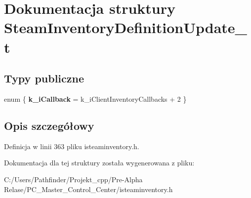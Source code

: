 \hypertarget{struct_steam_inventory_definition_update__t}{}\section{Dokumentacja struktury Steam\+Inventory\+Definition\+Update\+\_\+t}
\label{struct_steam_inventory_definition_update__t}
\subsection*{Typy publiczne}
\begin{DoxyCompactItemize}
\item 
\mbox{\label{struct_steam_inventory_definition_update__t_abe53f1c04478340a07a2617d50b1e409}} 
enum \{ {\bfseries k\+\_\+i\+Callback} = k\+\_\+i\+Client\+Inventory\+Callbacks + 2
 \}
\end{DoxyCompactItemize}


\subsection{Opis szczegółowy}


Definicja w linii 363 pliku isteaminventory.\+h.



Dokumentacja dla tej struktury została wygenerowana z pliku\+:\begin{DoxyCompactItemize}
\item 
C\+:/\+Users/\+Pathfinder/\+Projekt\+\_\+cpp/\+Pre-\/\+Alpha Relase/\+P\+C\+\_\+\+Master\+\_\+\+Control\+\_\+\+Center/isteaminventory.\+h\end{DoxyCompactItemize}
